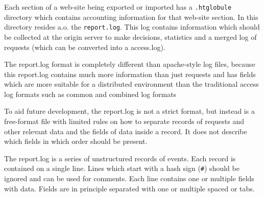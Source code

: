 \documentclass[10pt,a4paper]{article}
\makeatletter
\newenvironment{p}{\@open{P}{}}{\@close{P}}
\newenvironment{p}{}{\par}
\makeatother
\begin{document}
\begin{p}
Each section of a web-site being exported or imported has a \verb!.htglobule!
directory which contains accounting information for that web-site section.  In
this directory resides a.o. the \verb!report.log!.  This log contains
information which should be collected at the origin server to make decisions,
statistics and a merged log of requests (which can be converted into a
access.log).
\end{p}

\begin{p}
The report.log format is completely different than apache-style log files,
because this report.log contains much more information than just requests and
has fields which are more suitable for a distributed environment than the
traditional access log formats such as common and combined log formats
\end{p}

\begin{p}
To aid future development, the report.log is not a strict format, but instead
is a free-format file with limited rules on how to separate records of
requests and other relevant data and the fields of data inside a record.  It
does not describe which fields in which order should be present.
\end{p}

\begin{p}
The report.log is a series of unstructured records of events.  Each record is
contained on a single line.  Lines which start with a hash sign (\verb!#!)
should be ignored and can be used for comments.  Each line contains one or
multiple fields with data.  Fields are in principle separated with one or
multiple spaced or tabs.
\end{p}
\end{document}
